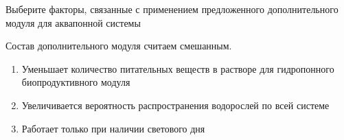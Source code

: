 
Выберите факторы, связанные с применением предложенного дополнительного модуля для аквапонной системы

Состав дополнительного модуля считаем смешанным. 

\begin{enumerate}
    \item Уменьшает количество питательных веществ в растворе для гидропонного биопродуктивного модуля
    \item Увеличивается вероятность распространения водорослей по всей системе
    \item Работает только при наличии светового дня
\end{enumerate}